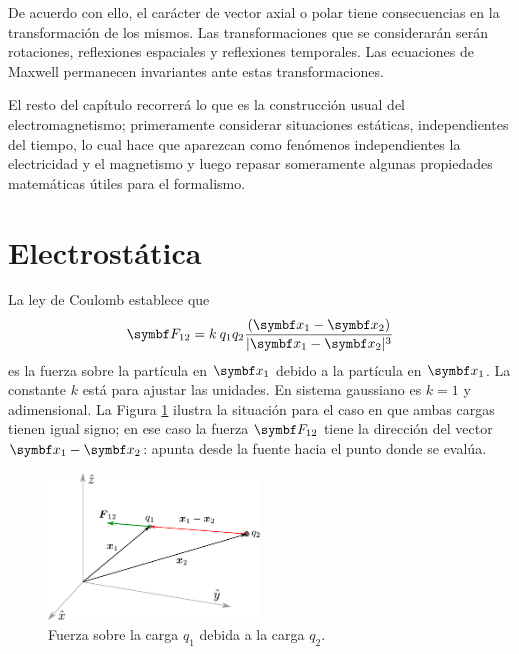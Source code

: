 \documentclass[10pt,oneside]{CBFT_book}
\begin{document}
De acuerdo con ello, el carácter de vector axial o polar tiene consecuencias en la transformación de
los mismos. Las transformaciones que se considerarán serán rotaciones, reflexiones espaciales y reflexiones
temporales. Las ecuaciones de Maxwell permanecen invariantes ante estas transformaciones.



El resto del capítulo recorrerá lo que es la construcción usual del electromagnetismo; primeramente considerar 
situaciones estáticas, independientes del tiempo, lo cual hace que aparezcan como fenómenos independientes la 
electricidad y el magnetismo y luego repasar someramente algunas propiedades matemáticas útiles para el
formalismo.

\section{Electrostática}

La ley de Coulomb establece que 
\[
	\vb{F}_{12} = k \: q_1 q_2 \frac{(\vb{x}_1 - \vb{x}_2)}{|\vb{x}_1 - \vb{x}_2 |^3}
\]
es la fuerza sobre la partícula en $\vb{x}_1$ debido a la partícula en $\vb{x}_1$. La constante $k$ está para ajustar
las unidades. En sistema gaussiano es $k=1$ y adimensional.
La Figura \ref{fig_ft1_ejescargas} ilustra la situación para el caso en que ambas cargas tienen igual signo; en ese
caso la fuerza $\vb{F}_{12}$ tiene la dirección del vector $\vb{x}_1 - \vb{x}_2$: apunta desde la fuente hacia el punto 
donde se evalúa.

\begin{figure}[!h]
	\begin{center}
	\includegraphics[width=0.5\textwidth]{images/fig_ft1_ejescargas.pdf}	 
	\end{center}
	\caption{Fuerza sobre la carga $q_1$ debida a la carga $q_2$.}
	\label{fig_ft1_ejescargas}
\end{figure} 
\end{document}
